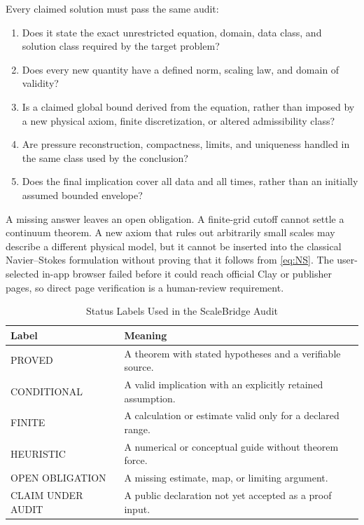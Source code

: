 \documentclass[conference]{../../../../Conference-LaTeX-template_10-17-19/IEEEtran}
\begin{document}
Every claimed solution must pass the same audit:
\begin{enumerate}
\item Does it state the exact unrestricted equation, domain, data class, and solution class required by the target problem?
\item Does every new quantity have a defined norm, scaling law, and domain of validity?
\item Is a claimed global bound derived from the equation, rather than imposed by a new physical axiom, finite discretization, or altered admissibility class?
\item Are pressure reconstruction, compactness, limits, and uniqueness handled in the same class used by the conclusion?
\item Does the final implication cover all data and all times, rather than an initially assumed bounded envelope?
\end{enumerate}
A missing answer leaves an open obligation. A finite-grid cutoff cannot settle a continuum theorem. A new axiom that rules out arbitrarily small scales may describe a different physical model, but it cannot be inserted into the classical Navier--Stokes formulation without proving that it follows from \eqref{eq:NS}. The user-selected in-app browser failed before it could reach official Clay or publisher pages, so direct page verification is a human-review requirement.

\begin{table}[t]
\caption{Status Labels Used in the ScaleBridge Audit}
\centering\small
\begin{tabular}{p{}p{}}
\toprule
Label & Meaning\\
\midrule
PROVED & A theorem with stated hypotheses and a verifiable source.\\
CONDITIONAL & A valid implication with an explicitly retained assumption.\\
FINITE & A calculation or estimate valid only for a declared range.\\
HEURISTIC & A numerical or conceptual guide without theorem force.\\
OPEN OBLIGATION & A missing estimate, map, or limiting argument.\\
CLAIM UNDER AUDIT & A public declaration not yet accepted as a proof input.\\
\bottomrule
\end{tabular}
\end{table}
\end{document}
